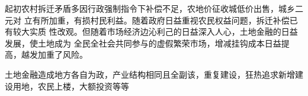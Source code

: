 起初农村拆迁矛盾多因行政强制指令下补偿不足，农地价征收城低价出售，城乡二元对
立有所加重，有损村民利益。随着政府日益重视农民权益问题，拆迁补偿已有较大实质
性改观。但随着市场经济边沁利己的日益深入人心，土地金融的日益发展，使土地成为
全民全社会共同参与的虚假繁荣市场，增减挂钩成本日益提高，越发加重了风险。


土地金融造成地方各自为政，产业结构相同且全副该，重复建设，狂热追求新增建设用地，农民上楼，大额投资等等














